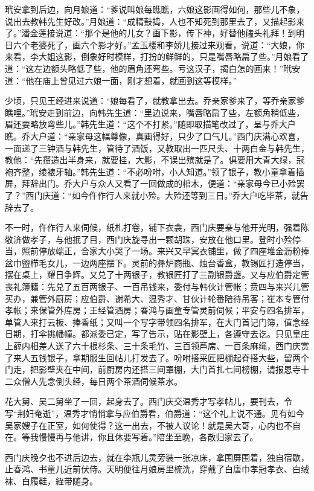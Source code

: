 玳安拿到后边，向月娘道：“爹说叫娘每瞧瞧，六娘这影画得如何，那些儿不象，说出去教韩先生好改。”月娘道：“成精鼓捣，人也不知死到那里去了，又描起影来了。”潘金莲接说道：“那个是他的儿女？画下影，传下神，好替他磕头礼拜！到明日六个老婆死了，画六个影才好。”孟玉楼和李娇儿接过来观看，说道：“大娘，你来看，李大姐这影，倒象好时模样，打扮的鲜鲜的，只是嘴唇略扁了些。”月娘看了道：“这左边额头略低了些，他的眉角还弯些。亏这汉子，揭白怎的画来！”玳安道：“他在庙上曾见过六娘一面，刚才想着，就画到这等模样。”

少顷，只见王经进来说道：“娘每看了，就教拿出去。乔亲家爹来了，等乔亲家爹瞧哩。”玳安走到前边，向韩先生道：“里边说来，嘴唇略扁了些，左额角稍低些，眉还要略放弯些儿。”韩先生道：“这个不打紧。”随即取描笔改过了，呈与乔大户瞧。乔大户道：“亲家母这幅尊像，真画得好，只少了口气儿。”西门庆满心欢喜，一面递了三钟酒与韩先生，管待了酒饭，又教取出一匹尺头、十两白金与韩先生，教他：“先攒造出半身来，就要挂，大影，不误出殡就是了。俱要用大青大绿，冠袍齐整，绫裱牙轴。”韩先生道：“不必吩咐，小人知道。”领了银子，教小童拿着插屏，拜辞出门。乔大户与众人又看了一回做成的棺木，便道：“亲家母今已小殓罢了？”西门庆道：“如今仵作行人来就小殓。大殓还等到三日。”乔大户吃毕茶，就告辞去了。

不一时，仵作行人来伺候，纸札打卷，铺下衣衾，西门庆要亲与他开光明，强着陈敬济做孝子，与他抿了目，西门庆旋寻出一颗胡珠，安放在他口里。登时小殓停当，照前停放端正，合家大小哭了一场。来兴又早冥衣铺里，做了四座堆金沥粉捧盆巾盥栉毛女儿，一边两座摆下。灵前的彝炉商瓶、烛台香盒，教锡匠打造停当，摆在桌上，耀日争辉。又兑了十两银子，教银匠打了三副银爵盏。又与应伯爵定管丧礼簿籍：先兑了五百两银子、一百吊钱来，委付与韩伙计管帐；贲四与来兴儿管买办，兼管外厨房；应伯爵、谢希大、温秀才、甘伙计轮番陪待吊客；崔本专管付孝帐；来保管外库房；王经管酒房；春鸿与画童专管灵前伺候；平安与四名排军，单管人来打云板、捧香纸；又叫一个写字带领四名排军，在大门首记门簿，值念经日期，打伞挑幡幢。都派委已定，写了告示，贴在影壁上，各遵守去讫。只见皇庄上薛内相差人送了六十根杉条、三十条毛竹、三百领芦席、一百条麻绳，西门庆赏了来人五钱银子，拿期服生回帖儿打发去了。吩咐搭采匠把棚起脊搭大些，留两个门走，把影壁夹在中间，前厨房内还搭三间罩棚，大门首扎七间榜棚，请报恩寺十二众僧人先念倒头经，每日两个茶酒伺候茶水。

花大舅、吴二舅坐了一回，起身去了。西门庆交温秀才写孝帖儿，要刊去，令写“荆妇奄逝”，温秀才悄悄拿与应伯爵看，伯爵道：“这个礼上说不通。见有如今吴家嫂子在正室，如何使得？这一出去，不被人议论！就是吴大哥，心内也不自在。等我慢慢再与他讲，你且休要写着。”陪坐至晚，各散归家去了。

西门庆晚夕也不进后边去，就在李瓶儿灵旁装一张凉床，拿围屏围着，独自宿歇，止春鸿、书童儿近前伏侍。天明便往月娘房里梳洗，穿戴了白唐巾孝冠孝衣、白绒袜、白履鞋，絰带随身。

